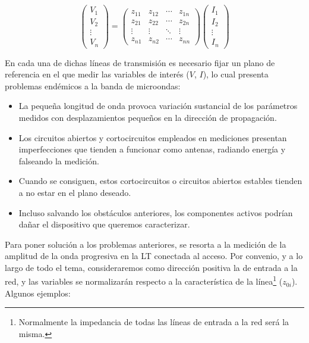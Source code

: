 \documentclass[12pt]{article}
\begin{document}
$$\left(\begin{array}{c}
	V_1 \\
	V_2 \\
	\vdots \\
	V_n
\end{array}\right)
=
\left(\begin{array}{cccc}
	z_{11} & z_{12} & \cdots & z_{1n} \\
	z_{21} & z_{22} & \cdots & z_{2n} \\
	\vdots & \vdots & \ddots & \vdots \\
	z_{n1} & z_{n2} & \cdots & z_{nn}
\end{array}
\right)
\left(\begin{array}{c}
	I_1 \\
	I_2 \\
	\vdots \\
	I_n
\end{array}\right)$$

En cada una de dichas l\'ineas de transmisi\'on es necesario fijar un plano de referencia en el que medir las variables de inter\'es ($V$, $I$), lo cual presenta problemas end\'emicos a la banda de microondas:

\begin{itemize}
	\item La peque\~na longitud de onda provoca variaci\'on sustancial de los par\'ametros medidos con desplazamientos peque\~nos en la direcci\'on de propagaci\'on.
	\item Los circuitos abiertos y cortocircuitos empleados en mediciones presentan imperfecciones que tienden a funcionar como antenas, radiando energ\'ia y falseando la medici\'on.
	\item Cuando se consiguen, estos cortocircuitos o circuitos abiertos estables tienden a no estar en el plano deseado.
	\item Incluso salvando los obst\'aculos anteriores, los componentes activos podr\'ian da\~nar el dispositivo que queremos caracterizar.
\end{itemize}

Para poner soluci\'on a los problemas anteriores, se resorta a la medici\'on de la amplitud de la onda progresiva en la LT conectada al acceso. Por convenio, y a lo largo de todo el tema, consideraremos como direcci\'on positiva la de entrada a la red, y las variables se normalizar\'an respecto a la caracter\'istica de la l\'inea\footnote{Normalmente la impedancia de todas las l\'ineas de entrada a la red ser\'a la misma.} ($z_{0i}$). Algunos ejemplos:
\end{document}
